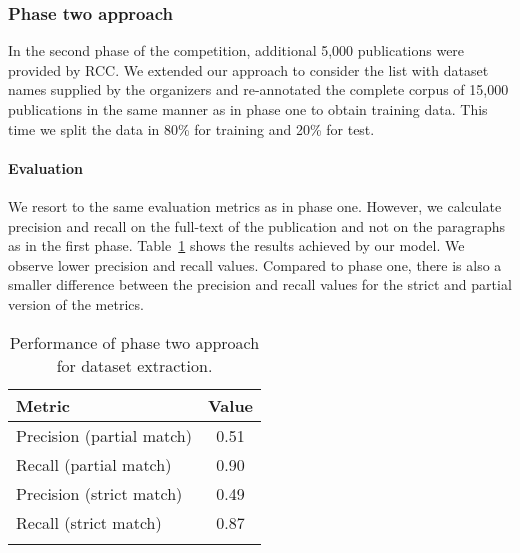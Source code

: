 \subsubsection{Phase two approach}
In the second phase of the competition, additional 5,000 publications were provided by RCC. We extended our approach to consider the list with dataset names supplied by the organizers and re-annotated the complete corpus of 15,000 publications in the same manner as in phase one to obtain training data. This time we split the data in 80\% for training and 20\% for test. 

\paragraph{Evaluation}
We resort to the same evaluation metrics as in phase one. However, we calculate precision and recall on the full-text of the publication and not on the paragraphs as in the first phase. Table~\ref{table:dataset-mention-eval-phase-two} shows the results achieved by our model. We observe lower precision and recall values. Compared to phase one, there is also a smaller difference between the precision and recall values for the strict and partial version of the metrics. 
\begin{table}[hb]
    \center 
    \caption{Performance of phase two approach for dataset extraction.} 
    \begin{tabular}{lc} 
        \toprule
        Metric  & Value \\
        \midrule
        Precision (partial match)   & 0.51 \\
        Recall (partial match)      & 0.90 \\
        \midrule
        Precision (strict match)    & 0.49 \\
        Recall (strict match)       & 0.87 \\ 
        \bottomrule \\ 
    \end{tabular} 
    \label{table:dataset-mention-eval-phase-two} 
\end{table}

